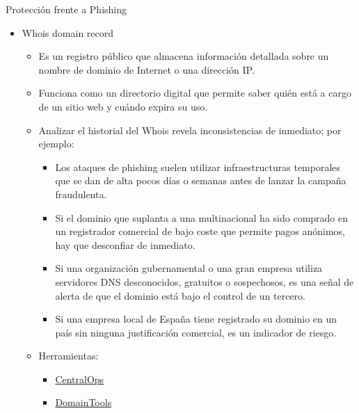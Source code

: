 \documentclass[aspectratio=169,11pt]{beamer}
\begin{document}
\begin{frame}[allowframebreaks]{Protección frente a Phishing}
\begin{itemize}
  \item Whois domain record
    \begin{itemize}
    \item Es un registro público que almacena información detallada sobre un nombre de dominio de Internet o una dirección IP.
    \item Funciona como un directorio digital que permite saber quién está a cargo de un sitio web y cuándo expira su uso.
    \item Analizar el historial del Whois revela inconsistencias de inmediato; por ejemplo:
      \begin{itemize}
      \item Los ataques de phishing suelen utilizar infraestructuras temporales que se dan de alta pocos días o semanas antes de lanzar la campaña fraudulenta.
      \item Si el dominio que suplanta a una multinacional ha sido comprado en un registrador comercial de bajo coste que permite pagos anónimos, hay que desconfiar de inmediato.
      \item Si una organización gubernamental o una gran empresa utiliza servidores DNS desconocidos, gratuitos o sospechosos, es una señal de alerta de que el dominio está bajo el control de un tercero.
      \item Si una empresa local de España tiene registrado su dominio en un país sin ninguna justificación comercial, es un indicador de riesgo.
      \end{itemize}
    \item Herramientas:
      \begin{itemize}
      \item \href{https://centralops.net/co/}{CentralOps}
      \item \href{https://whois.domaintools.com/}{DomainTools}
      \end{itemize}
    \end{itemize}


\end{itemize}
\end{frame}
\end{document}
